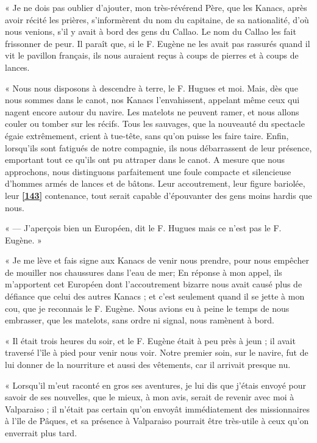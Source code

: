 \documentclass{article}
\begin{document}
        
    « Je ne dois pas oublier d'ajouter, mon très-révérend Père, que les Kanacs, après avoir récité les prières, s'informèrent du nom du capitaine, de sa nationalité, d'où nous venions, s'il y avait à bord des gens du Callao. Le nom du Callao les fait frissonner de peur. Il paraît que, si le F. Eugène ne les avait pas rassurés quand il vit le pavillon français, ils nous auraient reçus à coups de pierres et à coups de lances.
         
        
    « Nous nous disposons à descendre à terre, le F. Hugues et moi. Mais, dès que nous sommes dans le canot, nos Kanacs l'envahissent, appelant même ceux qui nagent encore autour du navire. Les matelots ne peuvent ramer, et nous allons couler ou tomber sur les récifs. Tous les sauvages, que la nouveauté du spectacle égaie extrêmement, crient à tue-tête, sans qu'on puisse les faire taire. Enfin, lorsqu'ils sont fatigués de notre compagnie, ils nous débarrassent de leur présence, emportant tout ce qu'ils ont pu attraper dans le canot. A mesure que nous approchons, nous distinguons parfaitement une foule compacte et silencieuse d'hommes armés de lances et de bâtons. Leur accoutrement, leur figure bariolée, leur \href{https://gallica.bnf.fr/iiif/ark:/12148/bpt6k5449280k/f150/full/full/0/native.jpg}{\textbf{[143]}} contenance, tout serait capable d'épouvanter des gens moins hardis que nous.
         
        
    « — J'aperçois bien un Européen, dit le F. Hugues mais ce n'est pas le F. Eugène. »
         
        
    « Je me lève et fais signe aux Kanacs de venir nous prendre, pour nous empêcher de mouiller nos chaussures dans l'eau de mer; En réponse à mon appel, ils m'apportent cet Européen dont l'accoutrement bizarre nous avait causé plus de défiance que celui des autres Kanacs ; et c'est seulement quand il se jette à mon cou, que je reconnais le F. Eugène. Nous avions eu à peine le temps de nous embrasser, que les matelots, sans ordre ni signal, nous ramènent à bord.
         
        
    « Il était trois heures du soir, et le F. Eugène était à peu près à jeun ; il avait traversé l'île à pied pour venir nous voir. Notre premier soin, sur le navire, fut de lui donner de la nourriture et aussi des vêtements, car il arrivait presque nu.
         
        
    « Lorsqu'il m'eut raconté en gros ses aventures, je lui dis que j'étais envoyé pour savoir de ses nouvelles, que le mieux, à mon avis, serait de revenir avec moi à Valparaiso ; il n'était pas certain qu'on envoyât immédiatement des missionnaires à l'île de Pâques, et sa présence à Valparaiso pourrait être très-utile à ceux qu'on enverrait plus tard.
         
\end{document}
